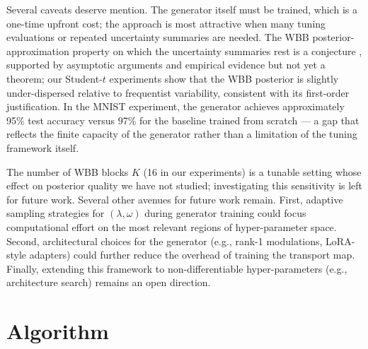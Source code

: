\documentclass[12pt]{article}
\begin{document}
Several caveats deserve mention. The generator itself must be trained, which is a one-time upfront cost; the approach is most attractive when many tuning evaluations or repeated uncertainty summaries are needed. The WBB posterior-approximation property on which the uncertainty summaries rest is a conjecture \citep{newton2021weighted}, supported by asymptotic arguments and empirical evidence but not yet a theorem; our Student-$t$ experiments show that the WBB posterior is slightly under-dispersed relative to frequentist variability, consistent with its first-order justification. In the MNIST experiment, the generator achieves approximately 95\% test accuracy versus 97\% for the baseline trained from scratch --- a gap that reflects the finite capacity of the generator rather than a limitation of the tuning framework itself.

The number of WBB blocks $K$ (16 in our experiments) is a tunable setting whose effect on posterior quality we have not studied; investigating this sensitivity is left for future work. Several other avenues for future work remain. First, adaptive sampling strategies for $(\lambda, \omega)$ during generator training could focus computational effort on the most relevant regions of hyper-parameter space. Second, architectural choices for the generator (e.g., rank-1 modulations, LoRA-style adapters) could further reduce the overhead of training the transport map. Finally, extending this framework to non-differentiable hyper-parameters (e.g., architecture search) remains an open direction.



\appendix
\section{Algorithm}
\end{document}
